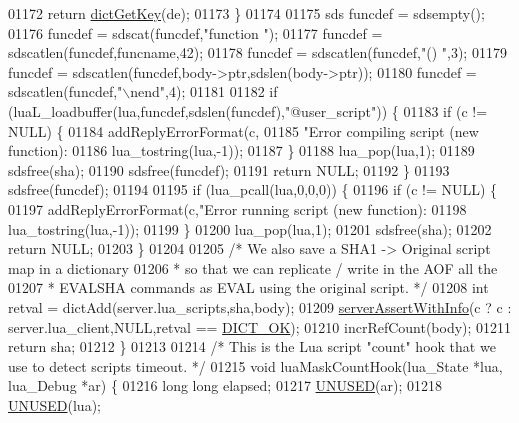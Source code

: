 \begin{DoxyCode}
{{{{{{{{{01172         \textcolor{keywordflow}{return} \hyperlink{dict_8h_a3271c334309904a3086deca94f96e46e}{dictGetKey}(de);
01173     \}
01174 
01175     sds funcdef = sdsempty();
01176     funcdef = sdscat(funcdef,\textcolor{stringliteral}{"function "});
01177     funcdef = sdscatlen(funcdef,funcname,42);
01178     funcdef = sdscatlen(funcdef,\textcolor{stringliteral}{"() "},3);
01179     funcdef = sdscatlen(funcdef,body->ptr,sdslen(body->ptr));
01180     funcdef = sdscatlen(funcdef,\textcolor{stringliteral}{"\(\backslash\)nend"},4);
01181 
01182     \textcolor{keywordflow}{if} (luaL\_loadbuffer(lua,funcdef,sdslen(funcdef),\textcolor{stringliteral}{"@user\_script"})) \{
01183         \textcolor{keywordflow}{if} (c != NULL) \{
01184             addReplyErrorFormat(c,
01185                 \textcolor{stringliteral}{"Error compiling script (new function): %
01186                 lua\_tostring(lua,-1));
01187         \}
01188         lua\_pop(lua,1);
01189         sdsfree(sha);
01190         sdsfree(funcdef);
01191         \textcolor{keywordflow}{return} NULL;
01192     \}
01193     sdsfree(funcdef);
01194 
01195     \textcolor{keywordflow}{if} (lua\_pcall(lua,0,0,0)) \{
01196         \textcolor{keywordflow}{if} (c != NULL) \{
01197             addReplyErrorFormat(c,\textcolor{stringliteral}{"Error running script (new function): %
01198                 lua\_tostring(lua,-1));
01199         \}
01200         lua\_pop(lua,1);
01201         sdsfree(sha);
01202         \textcolor{keywordflow}{return} NULL;
01203     \}
01204 
01205     \textcolor{comment}{/* We also save a SHA1 -> Original script map in a dictionary}
01206 \textcolor{comment}{     * so that we can replicate / write in the AOF all the}
01207 \textcolor{comment}{     * EVALSHA commands as EVAL using the original script. */}
01208     \textcolor{keywordtype}{int} retval = dictAdd(server.lua\_scripts,sha,body);
01209     \hyperlink{server_8h_a7308f76cbff9a8d3797fe78190b91282}{serverAssertWithInfo}(c ? c : server.lua\_client,NULL,retval == 
      \hyperlink{dict_8h_a2afecbeab8f7efbc183048f52f6d17e5}{DICT\_OK});
01210     incrRefCount(body);
01211     \textcolor{keywordflow}{return} sha;
01212 \}
01213 
01214 \textcolor{comment}{/* This is the Lua script "count" hook that we use to detect scripts timeout. */}
01215 \textcolor{keywordtype}{void} luaMaskCountHook(lua\_State *lua, lua\_Debug *ar) \{
01216     \textcolor{keywordtype}{long} \textcolor{keywordtype}{long} elapsed;
01217     \hyperlink{server_8h_ae7c9dc8f13568a9c856573751f1ee1ec}{UNUSED}(ar);
01218     \hyperlink{server_8h_ae7c9dc8f13568a9c856573751f1ee1ec}{UNUSED}(lua);
}}}}}}}}}}}
\end{DoxyCode}
